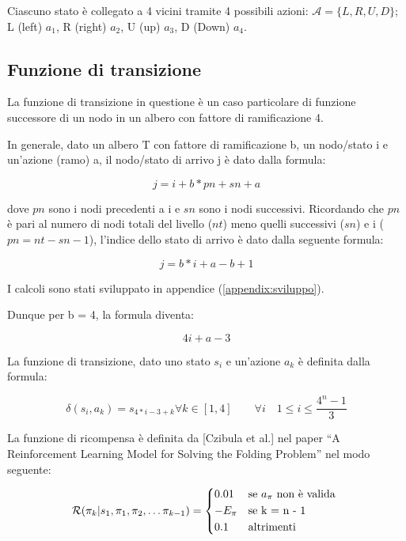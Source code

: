 \documentclass[conference]{IEEEtran}
\begin{document}
Ciascuno stato è collegato a 4 vicini tramite 4 possibili azioni: $\mathcal{A} = \{ L, R, U, D\}$; L (left) $a_1$, R (right) $a_2$, U (up) $a_3$, D (Down) $a_4$.

\subsection{Funzione di transizione}

La funzione di transizione in questione è un caso particolare di funzione successore di un nodo in un albero con fattore di ramificazione 4.

In generale, dato un albero T con fattore di ramificazione b, un nodo/stato i e un'azione (ramo) a, il nodo/stato di arrivo j è dato dalla formula:

\begin{equation}
j = i + b*pn + sn + a
\end{equation}

dove $pn$ sono i nodi precedenti a i e $sn$ sono i nodi successivi. Ricordando che $pn$ è pari al numero di nodi totali del livello ($nt$) meno quelli successivi ($sn$) e i ($pn = nt - sn - 1$), l'indice dello stato di arrivo è dato dalla seguente formula:

\begin{equation}
j = b*i + a - b + 1
\end{equation}

I calcoli sono stati sviluppato in appendice (\ref{appendix:sviluppo}).

Dunque per b = 4, la formula diventa:

\begin{equation}
\tag{Funzione di transizione}
4i + a - 3
\end{equation}

La funzione di transizione, dato uno stato $s_i$ e un'azione $a_k$ è definita dalla formula:

\begin{equation}
\delta(s_i, a_k) = s_{4*i - 3 + k} \forall k \in [1,4] \qquad \forall i \quad 1 \leq i \leq \frac{4^n - 1}{3}
\end{equation}

La funzione di ricompensa è definita da [Czibula et al.] nel paper ``A Reinforcement Learning Model for Solving the Folding Problem'' nel modo seguente:

\begin{equation}
    \label{eq:rew}
    \mathcal{R}(\pi_k| s_1, \pi_1, \pi_2, \dots \pi_{k-1}) =
    \begin{cases*}
      0.01 & se $a_{\pi}$ non è valida \\
      - E_{\pi} & se k = n - 1 \\
      0.1 & altrimenti
    \end{cases*}
\end{equation}
\end{document}
